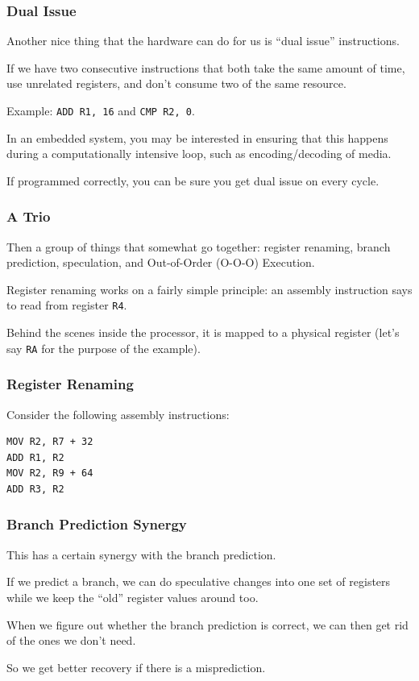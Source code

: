 \begin{frame}
\frametitle{Dual Issue}

Another nice thing that the hardware can do for us is ``dual issue'' instructions. 

If we have two consecutive instructions that both take the same amount of time, use unrelated registers, and don't consume two of the same resource.

Example: \texttt{ADD R1, 16} and \texttt{CMP R2, 0}. 

In an embedded system, you may be interested in ensuring that this happens during a computationally intensive loop, such as encoding/decoding of media. 

If programmed correctly, you can be sure you get dual issue on every cycle.


\end{frame}




\begin{frame}
\frametitle{A Trio}

Then a group of things that somewhat go together: register renaming, branch prediction, speculation, and Out-of-Order (O-O-O) Execution. 

Register renaming works on a fairly simple principle: an assembly instruction says to read from register \texttt{R4}. 

Behind the scenes inside the processor, it is mapped to a physical register (let's say \texttt{RA} for the purpose of the example).


\end{frame}



\begin{frame}[fragile]
\frametitle{Register Renaming}

Consider the following assembly instructions:

\begin{verbatim}
MOV R2, R7 + 32
ADD R1, R2
MOV R2, R9 + 64
ADD R3, R2
\end{verbatim}

\end{frame}




\begin{frame}
\frametitle{Branch Prediction Synergy}

This has a certain synergy with the branch prediction. 

If we predict a branch, we can do speculative changes into one set of registers while we keep the ``old'' register values around too. 

When we figure out whether the branch prediction is correct, we can then get rid of the ones we don't need.

So we get better recovery if there is a misprediction.

\end{frame}



